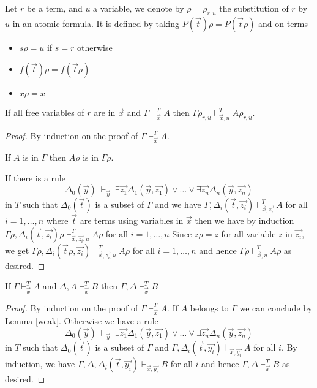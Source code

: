 \documentclass[10pt,a4paper]{article}
\begin{document}
 Let $r$ be a term, and $u$ a variable, we denote by $\rho = \rho_{r,u}$ the substitution of $r$ by $u$
in an atomic formula. It is defined by taking $P(\vec{t})\rho = P(\vec{t}\rho)$ and
on terms
\begin{itemize}
\item $s\rho = u$ if $s = r$ otherwise
\item $f(\vec{t})\rho = f(\vec{t}\rho)$
\item $x\rho = x$
\end{itemize}

\begin{lemma}\label{subst2}
If all free variables of $r$ are in $\vec{x}$ and
$\Gamma\vdash_{\vec{x}}^T A$ then $\Gamma\rho_{r,u}\vdash_{\vec{x},u}^T A\rho_{r,u}$.
\end{lemma}

\begin{proof}
By induction on the proof of $\Gamma\vdash_{\vec{x}}^T A$.

If $A$ is in $\Gamma$ then $A\rho$ is in $\Gamma\rho$.

If there is a rule
$$
\Delta_0(\vec{y})~\vdash_{\vec{y}}~
\exists \vec{z_1}\Delta_1(\vec{y},\vec{z_1})\vee\dots\vee\exists \vec{z_n}\Delta_n(\vec{y},\vec{z_n})
$$
in $T$ such that $\Delta_0(\vec{t})$ is a subset of $\Gamma$ and
we have $\Gamma,\Delta_i(\vec{t},\vec{z_i})\vdash^T_{\vec{x},\vec{z_i}} A$ for all $i = 1,\dots,n$
where $\vec{t}$ are terms using variables in $\vec{x}$ then we have by induction
$\Gamma\rho,\Delta_i(\vec{t},\vec{z_i})\rho\vdash^T_{\vec{x},\vec{z_i},u} A\rho$ for all $i = 1,\dots,n$
Since $z\rho = z$ for all variable $z$ in $\vec{z_i}$, we get
$\Gamma\rho,\Delta_i(\vec{t}\rho,\vec{z_i})\vdash^T_{\vec{x},\vec{z_i},u} A\rho$ for all $i = 1,\dots,n$
and hence $\Gamma\rho\vdash^T_{\vec{x},u} A\rho$ as desired.
\end{proof}

\begin{lemma}\label{cut}
If $\Gamma\vdash_{\vec{x}}^T A$ and $\Delta,A\vdash_{\vec{x}}^T B$ then
$\Gamma,\Delta\vdash_{\vec{x}}^T B$
\end{lemma}

\begin{proof}
By induction on the proof of $\Gamma\vdash_{\vec{x}}^T A$. If $A$ belongs to $\Gamma$ we can
conclude by Lemma \ref{weak}. 
Otherwise we have a rule
$$
\Delta_0(\vec{y})~\vdash_{\vec{y}}~
\exists \vec{z_1}\Delta_1(\vec{y},\vec{z_1})\vee\dots\vee\exists \vec{z_n}\Delta_n(\vec{y},\vec{z_n})
$$
in $T$ such that $\Delta_0(\vec{t})$ is a subset of $\Gamma$ and
$\Gamma,\Delta_i(\vec{t},\vec{y_i})\vdash_{\vec{x},\vec{y_i}} A$ for all $i$.
By induction, we have $\Gamma,\Delta,\Delta_i(\vec{t},\vec{y_i})\vdash_{\vec{x},\vec{y_i}} B$ for all $i$
and hence $\Gamma,\Delta\vdash_{\vec{x}}^T B$ as desired.
\end{proof}
\end{document}

